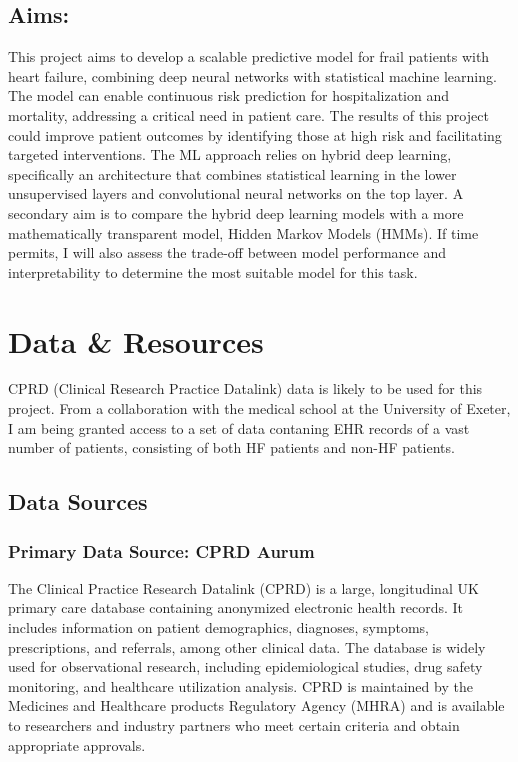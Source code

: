 \documentclass[%
 reprint,
 amsmath,amssymb,
 aps,
 nofootinbib,
]{revtex4-2}
\theoremstyle{definition}
\begin{document}
\subsection{Aims:}

This project aims to develop a scalable predictive model for frail patients with heart failure, combining deep neural networks with statistical machine learning. The model can enable continuous risk prediction for hospitalization and mortality, addressing a critical need in patient care. The results of this project could improve patient outcomes by identifying those at high risk and facilitating targeted interventions. The ML approach relies on hybrid deep learning, specifically an architecture that combines statistical learning in the lower unsupervised layers and convolutional neural networks on the top layer. A secondary aim is to compare the hybrid deep learning models with a more mathematically transparent model, Hidden Markov Models (HMMs). If time permits, I will also assess the trade-off between model performance and interpretability to determine the most suitable model for this task.

\section{\label{datares}Data \& Resources}
CPRD (Clinical Research Practice Datalink) data is likely to be used for this project. From a collaboration with the medical school at the University of Exeter, I am being granted access to a set of data contaning EHR records of a vast number of patients, consisting of both HF patients and non-HF patients.

\subsection{\label{data}Data Sources}

\subsubsection{\label{cprd} Primary Data Source: CPRD Aurum}
The Clinical Practice Research Datalink (CPRD) is a large, longitudinal UK primary care database containing anonymized electronic health records. It includes information on patient demographics, diagnoses, symptoms, prescriptions, and referrals, among other clinical data. The database is widely used for observational research, including epidemiological studies, drug safety monitoring, and healthcare utilization analysis. CPRD is maintained by the Medicines and Healthcare products Regulatory Agency (MHRA) and is available to researchers and industry partners who meet certain criteria and obtain appropriate approvals.\\
\end{document}
